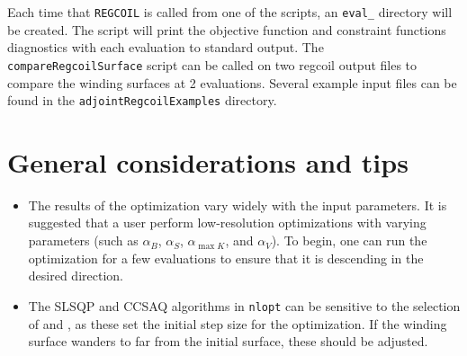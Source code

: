 Each time that \texttt{REGCOIL} is called from one of the scripts, an \texttt{eval\_} directory will be created. The script will print the objective function and constraint functions diagnostics with each evaluation to standard output. The \texttt{compareRegcoilSurface} script can be called on two regcoil output files to compare the winding surfaces at 2 evaluations. Several example input files can be found in the \texttt{adjointRegcoilExamples} directory.

\section{General considerations and tips}
\begin{itemize}
\item The results of the optimization vary widely with the input parameters. It is suggested that a user perform low-resolution optimizations with varying parameters (such as $\alpha_B$, $\alpha_S$, $\alpha_{\max{K}}$, and $\alpha_V$). To begin, one can run the optimization for a few evaluations to ensure that it is descending in the desired direction. 
\item The SLSQP and CCSAQ algorithms in \texttt{nlopt} can be sensitive to the selection of  and , as these set the initial step size for the optimization. If the winding surface wanders to far from the initial surface, these should be adjusted. 
\end{itemize}



